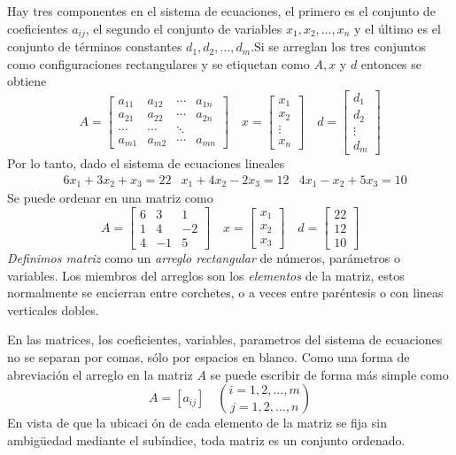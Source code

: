 Hay tres componentes en el sistema de ecuaciones, el primero es el conjunto de coeficientes \(a_{ij}\), el segundo el conjunto de variables \(x_1,x_2,\dots,x_n\) y el último es el conjunto de términos constantes \(d_1, d_2, \dots, d_m\).Si se arreglan los tres conjuntos como configuraciones rectangulares y se etiquetan como \(A,x\) y \(d\) entonces se obtiene
\[
A = \begin{bmatrix}
a_{11} & a_{12} & \cdots & a_{1n} \\
a_{21} & a_{22} & \cdots & a_{2n} \\
\cdots  & \cdots  & \ddots \\
a_{m1} & a_{m2} & \cdots & a_{mn}
\end{bmatrix}
\quad
x = \begin{bmatrix}
x_1 \\ 
x_2 \\
\vdots \\
x_n
\end{bmatrix}
\quad
d = \begin{bmatrix}
d_1 \\
d_2 \\
\vdots \\ 
d_m
\end{bmatrix}
\]
Por lo tanto, dado el sistema de ecuaciones lineales 
$$
\begin{aligned}
    & 6x_1 + 3x_2 + x_3 = 22
    & x_1 + 4x_2 - 2x_3 = 12
    & 4x_1 - x_2 + 5x_3 = 10
\end{aligned}
$$
Se puede ordenar en una matriz como 
\[
A = \begin{bmatrix}
6 & 3 & 1 \\
1 & 4 & -2 \\
4 & -1 & 5
\end{bmatrix}
\quad
x = \begin{bmatrix}
x_1 \\ 
x_2 \\
x_3
\end{bmatrix}
\quad
d = \begin{bmatrix}
22 \\
12 \\
10
\end{bmatrix}
\]
\textit{Definimos matriz} como un \textit{arreglo rectangular} de números, parámetros o variables. Los miembros del arreglos son los \textit{elementos} de la matriz, estos normalmente se encierran entre corchetes, o a veces entre paréntesis o con lineas verticales dobles.

En las matrices, los coeficientes, variables, parametros del sistema de ecuaciones no se separan por comas, sólo por espacios en blanco. Como una forma de abreviación el arreglo en la matriz \(A\) se puede escribir de forma más simple como 
\[
A = [a_{ij}] \quad \binom{i = 1, 2, \dots, m}{j = 1, 2, \dots, n} 
\]
En vista de que la ubicaci ón de cada elemento de la matriz se fija sin ambigüedad mediante el subíndice, toda matriz es un conjunto ordenado.


